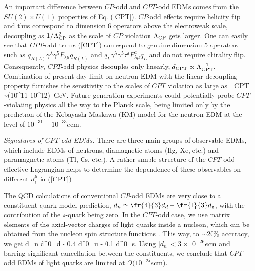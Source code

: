 \documentclass[prl,twocolumn,tightenlines,preprintnumbers,floatfix,nofootinbib]{revtex4}
\begin{document}
An important difference between $CP$-odd and $CPT$-odd EDMs comes from the 
$SU(2)\times U(1)$ properties of Eq. (\ref{CPT}). 
$CP$-odd effects require helicity flip and thus correspond to dimension 6 operators
above the electroweak scale, decoupling as $1/\Lambda^2_{\rm CP}$ as the scale of 
$CP$ violation $\Lambda_{\rm CP}$ gets larger. 
One can easily see that $CPT$-odd terms (\ref{CPT}) 
correspond to genuine dimension 
5 operators such as $\bar q_{R(L)} \gamma^\lambda \gamma^5 F_{\lambda\mu} q_{R(L)}$
and $\bar q_L \gamma^\lambda \gamma^5 \tau^a F^a_{\lambda\mu} q_L$ and do not
require chirality flip.  
Consequently, $CPT$-odd physics decouples only linearly, $d_{\rm CPT} \propto 
\Lambda_{\rm CPT}^{-1}$. Combination of present day limit on neutron EDM with the
linear decoupling property furnishes the sensitivity to the scales of $CPT$ violation as 
large as
\be
\Lambda_{\rm CPT} \sim (10^{11}-10^{12})~{\rm GeV}.
\label{range}
\ee
Future generation experiments could 
potentially probe $CPT$-violating physics all the way to the Planck 
scale, being limited only by the prediction of the Kobayashi-Maskawa (KM) model for the 
neutron EDM at the level of $10^{-31}-10^{-33}e$cm.


{\em Signatures of $CPT$-odd EDMs. }
There are three main groups of observable EDMs, which include EDMs of neutrons, 
diamagnetic atoms (Hg, Xe, etc.) and paramagnetic  atoms (Tl, Cs, etc.). 
A rather simple structure of the $CPT$-odd effective Lagrangian 
helps to determine the dependence of these
observables on different $d_i^\mu$ in  (\ref{CPT}).

The QCD calculations of conventional $CP$-odd EDMs \cite{PRann}
are very close 
to a constituent quark model prediction, $d_n \simeq \fr{4}{3} d_d- \fr{1}{3} d_u$,
with the contribution of the $s$-quark being zero. In the $CPT$-odd case, we use 
matrix elements of the axial-vector charges of light quarks inside a nucleon, 
which can be obtained from the nucleon spin structure functions \cite{EK}. 
This way, to $\sim$20\% accuracy, we get
\be
d_n  d^0_d - 0.4 d^0_u - 0.1 d^0_s.
\label{dn}
\ee
Using $|d_n| < 3\times 10^{-26} e$cm \cite{exp}
and barring significant cancellation between the constituents, 
we conclude that $CPT$-odd EDMs of light quarks are limited 
at $O(10^{-25}e$cm$)$.
\end{document}
